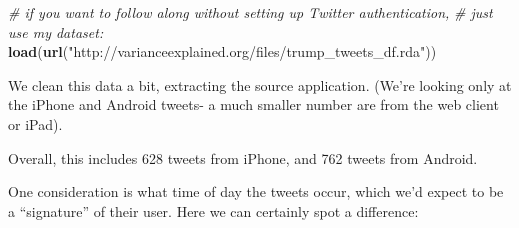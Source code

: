 \documentclass[
]{article}
\newenvironment{Shaded}{\begin{snugshade}}{\end{snugshade}}
\newcommand{\CommentTok}[1]{\textcolor[rgb]{0.56,0.35,0.01}{\textit{#1}}}
\newcommand{\DataTypeTok}[1]{\textcolor[rgb]{0.13,0.29,0.53}{#1}}
\newcommand{\KeywordTok}[1]{\textcolor[rgb]{0.13,0.29,0.53}{\textbf{#1}}}
\newcommand{\NormalTok}[1]{#1}
\newcommand{\OperatorTok}[1]{\textcolor[rgb]{0.81,0.36,0.00}{\textbf{#1}}}
\newcommand{\StringTok}[1]{\textcolor[rgb]{0.31,0.60,0.02}{#1}}
\begin{document}
\begin{Shaded}
\begin{Highlighting}[]
\CommentTok{# if you want to follow along without setting up Twitter authentication,}
\CommentTok{# just use my dataset:}
\KeywordTok{load}\NormalTok{(}\KeywordTok{url}\NormalTok{(}\StringTok{"http://varianceexplained.org/files/trump_tweets_df.rda"}\NormalTok{))}
\end{Highlighting}
\end{Shaded}

We clean this data a bit, extracting the source application. (We're
looking only at the iPhone and Android tweets- a much smaller number are
from the web client or iPad).

\begin{Shaded}
\end{Shaded}

Overall, this includes 628 tweets from iPhone, and 762 tweets from
Android.

One consideration is what time of day the tweets occur, which we'd
expect to be a ``signature'' of their user. Here we can certainly spot a
difference:

\begin{Shaded}
\end{Shaded}
\end{document}
